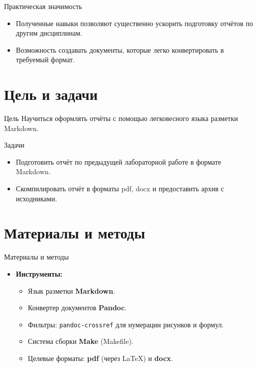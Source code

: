 \documentclass[
  ignorenonframetext,
  aspectratio=169,
  russian,
  aspectratio=169]{beamer}
\providecommand{\tightlist}{%
  \setlength{\itemsep}{0pt}\setlength{\parskip}{0pt}}
\begin{document}
\begin{frame}{Практическая значимость}
\label{ux43fux440ux430ux43aux442ux438ux447ux435ux441ux43aux430ux44f-ux437ux43dux430ux447ux438ux43cux43eux441ux442ux44c}
\begin{itemize}[<+->]
\tightlist
\item
  Полученные навыки позволяют существенно ускорить подготовку отчётов по
  другим дисциплинам.
\item
  Возможность создавать документы, которые легко конвертировать в
  требуемый формат.
\end{itemize}
\end{frame}

\section{Цель и
задачи}\label{ux446ux435ux43bux44c-ux438-ux437ux430ux434ux430ux447ux438}

\begin{frame}{Цель}
\label{ux446ux435ux43bux44c}
Научиться оформлять отчёты с помощью легковесного языка разметки
Markdown.
\end{frame}

\begin{frame}{Задачи}
\label{ux437ux430ux434ux430ux447ux438}
\begin{itemize}[<+->]
\tightlist
\item
  Подготовить отчёт по предыдущей лабораторной работе в формате
  Markdown.
\item
  Скомпилировать отчёт в форматы pdf, docx и предоставить архив с
  исходниками.
\end{itemize}
\end{frame}

\section{Материалы и
методы}\label{ux43cux430ux442ux435ux440ux438ux430ux43bux44b-ux438-ux43cux435ux442ux43eux434ux44b}

\begin{frame}[fragile]{Материалы и методы}
\label{ux43cux430ux442ux435ux440ux438ux430ux43bux44b-ux438-ux43cux435ux442ux43eux434ux44b-1}
\begin{itemize}[<+->]
\tightlist
\item
  \textbf{Инструменты:}

  \begin{itemize}[<+->]
  \tightlist
  \item
    Язык разметки \textbf{Markdown}.
  \item
    Конвертер документов \textbf{Pandoc}.
  \item
    Фильтры: \texttt{pandoc-crossref} для нумерации рисунков и формул.
  \item
    Система сборки \textbf{Make} (Makefile).
  \item
    Целевые форматы: \textbf{pdf} (через LaTeX) и \textbf{docx}.
  \end{itemize}
\end{itemize}
\end{frame}
\end{document}
